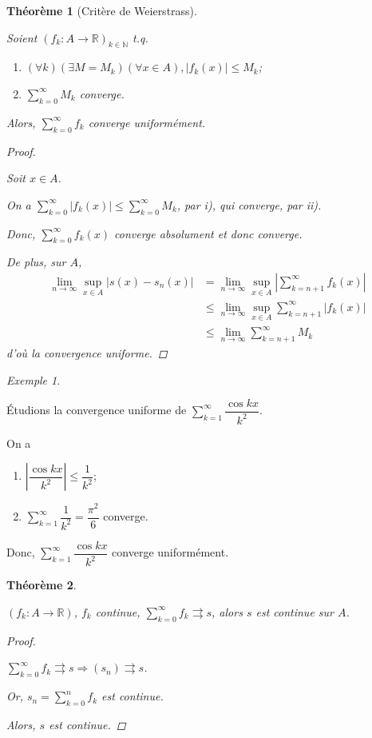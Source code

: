 \documentclass{report}
\newcommand*{\dsum}[4]{\displaystyle\sum_{#1=#2}^{#3}#4}
\newcommand*{\dlim}[3]{\displaystyle\lim_{#1 \to #2}#3}
\newcommand*{\abs}[1]{\left| #1 \right|}
\newcommand*{\convuni}{\rightrightarrows}
\newcommand*{\lte}{\leqslant}
\newcommand*{\reels}{\mathbb{R}}
\newcommand*{\naturels}{\mathbb{N}}
\newtheorem*{thm}{Th\'eor\`eme}
\theoremstyle{definition}
\theoremstyle{remark}
\newtheorem*{exem}{Exemple}
\begin{document}
	\begin{thm}[Crit\`ere de Weierstrass]~

		Soient $(f_k:A \to \reels)_{k \in \naturels}$ t.q.
		\begin{enumerate}[label=\roman*),nosep]
			\item $(\forall k)(\exists M=M_k)(\forall x \in A), \abs{f_k(x)} \lte M_k$;
			\item $\dsum{k}{0}{\infty}{M_k}$ converge.
		\end{enumerate}

		Alors, $\dsum{k}{0}{\infty}{f_k}$ converge uniform\'ement.
		\begin{proof}~

			Soit $x \in A$.

			On a $\dsum{k}{0}{\infty}{\abs{f_k(x)}} \lte \dsum{k}{0}{\infty}{M_k}$, par \textit{i)}, qui converge, par \textit{ii)}.

			Donc, $\dsum{k}{0}{\infty}{f_k(x)}$ converge absolument et donc converge.

			De plus, sur $A$,
			\begin{align*}
				\dlim{n}{\infty}{\sup\limits_{x \in A}\abs{s(x)-s_n(x)}}&= \dlim{n}{\infty}{\sup\limits_{x \in A}\abs{\dsum{k}{n+1}{\infty}{f_k(x)}}}\\
				&\lte \dlim{n}{\infty}{\sup\limits_{x \in A}\dsum{k}{n+1}{\infty}{\abs{f_k(x)}}}\\
				&\lte \dlim{n}{\infty}{\dsum{k}{n+1}{\infty}{M_k}}
			\end{align*}
			d'o\`u la convergence uniforme.
		\end{proof}
	\end{thm}
	\begin{exem}~

		\'Etudions la convergence uniforme de $\dsum{k}{1}{\infty}{\dfrac{\cos kx}{k^2}}$.

		On a
		\begin{enumerate}[label=\roman*)]
			\item $\abs{\dfrac{\cos kx}{k^2}} \lte \dfrac{1}{k^2}$;
			\item $\dsum{k}{1}{\infty}{\dfrac{1}{k^2}} = \dfrac{\pi^2}{6}$ converge.
		\end{enumerate}

		Donc, $\dsum{k}{1}{\infty}{\dfrac{\cos kx}{k^2}}$ converge uniform\'ement.
	\end{exem}
	\begin{thm}~

		$(f_k:A \to \reels)$, $f_k$ continue, $\dsum{k}{0}{\infty}{f_k} \convuni s$, alors $s$ est continue sur $A$.
		\begin{proof}~

			$\dsum{k}{0}{\infty}{f_k} \convuni s \Rightarrow (s_n) \convuni s$.

			Or, $s_n = \dsum{k}{0}{n}{f_k}$ est continue.

			Alors, $s$ est continue.
		\end{proof}
	\end{thm}
\end{document}
